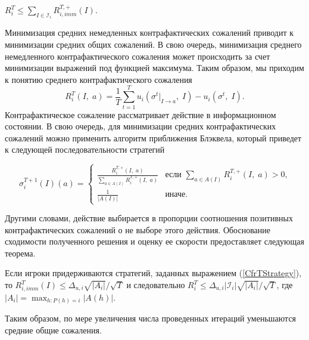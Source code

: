 \begin{theo} 
	$R_i^T \leq \sum_{I\in \mathcal{I}_i}R_{i,imm}^{T,+}(I)$\cite{NIPS07cfr}.
\end{theo}

Минимизация средних немедленных контрафактических сожалений приводит к минимизации средних общих сожалений. В свою очередь, минимизация среднего немедленного контрафактического сожаления может происходить за счет минимизации выражений под функцией максимума. Таким образом, мы приходим к понятию среднего контрафактического сожаления 
\begin{equation}
	R_i^T(I,\; a) = \frac{1}{T}\sum_{t=1}^{T}u_i(\sigma^t |_{I \to a},\;I)-u_i(\sigma^t,\;I).
\end{equation}
Контрафактическое сожаление рассматривает действие в информационном состоянии. В свою очередь, для минимизации средних контрафактических сожалений можно применить алгоритм приближения Блэквела\cite{RegretMatching}, который приведет к следующей последовательности стратегий 

\begin{equation}\label{CfrTStrategy}
	\sigma_i^{T+1}(I)(a)= 
	\begin{cases}
		\frac{R_i^{T,+}(I,\;a)}{\sum_{a\in A(I)}R_i^{T,+}(I,\;a)} &\text{если $\sum_{a\in A(I)}R_i^{T,+}(I,\;a) > 0$,}\\
		\frac{1}{|A(I)|} &\text{иначе.}
	\end{cases}
\end{equation}

Другими словами, действие выбирается в пропорции соотношения позитивных контрафактических сожалений о не выборе этого действия. Обоснование сходимости полученного решения и оценку ее скорости предоставляет следующая теорема. 

\begin{theo}\label{CfrTStrategyExp}
	 Если игроки придерживаются стратегий, заданных выражением (\ref{CfrTStrategy}), то $R_{i,imm}^T(I) \leq \Delta_{u,i}\sqrt{|A_i|}/\sqrt{T}$ и следовательно $R_i^T \leq \Delta_{u,i}|\mathcal{I}_i|\sqrt{|A_i|}/\sqrt{T}$, где $|A_i|=\max_{h\colon P(h)=i}|A(h)|$\cite{NIPS07cfr}.
\end{theo}

\par
Таким образом, по мере увеличения числа проведенных итераций уменьшаются средние общие сожаления.